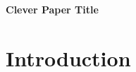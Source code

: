 \documentclass[12pt]{article}
\begin{document}
\thispagestyle{empty}		%

\begin{center}
    {\huge \textbf{Clever Paper Title} \par}
\end{center}



\section{Introduction}
\end{document}
